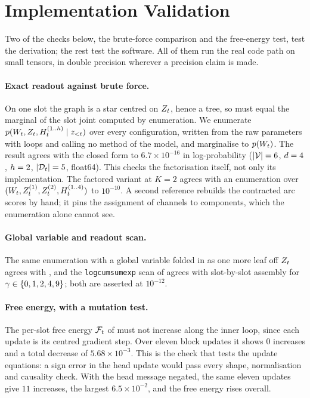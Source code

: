 \section{Implementation Validation}
\label{app:validation}

Two of the checks below, the brute-force comparison and the free-energy test, test the
derivation; the rest test the software. All of them run the
real code path on small tensors, in double precision wherever a precision claim is made.

\paragraph{Exact readout against brute force.}
On one slot the graph is a star centred on $Z_{t}$, hence a tree, so 
must equal the marginal of the slot joint computed by enumeration. We enumerate
$p(W_{t}, Z_{t}, H_{t}^{(1..h)} \mid z_{{<}t})$ over every configuration, written
from the raw parameters with loops and calling no method of the model, and marginalise to
$p(W_{t})$. The result agrees with the closed form to $6.7\times10^{-16}$ in log-probability
($|\mathcal{V}|=6$, $d=4$, $h=2$, $|\mathcal{D}_{t}|=5$, float64). This checks the factorisation
itself, not only its implementation. The factored variant at $K=2$ agrees with an enumeration
over $(W_{t}, Z_{t}^{(1)}, Z_{t}^{(2)}, H_{t}^{(1..4)})$ to $10^{-10}$. A second reference
rebuilds the contracted arc scores by hand; it pins the assignment of channels to components,
which the enumeration alone cannot see.

\paragraph{Global variable and readout scan.}
The same enumeration with a global variable folded in as one more leaf off $Z_{t}$ agrees with
, and the \texttt{logcumsumexp} scan of  agrees with
slot-by-slot assembly for $\gamma\in\{0,1,2,4,9\}$; both are asserted at $10^{-12}$.

\paragraph{Free energy, with a mutation test.}
The per-slot free energy $\mathcal{F}_t$ of  must not increase along the
inner loop, since each update is its centred gradient step. Over eleven block updates it shows
$0$ increases and a total decrease of $5.68\times10^{-3}$. This is the check that tests the
update equations: a sign error in the head update would pass every shape, normalisation and
causality check. With the head message negated, the same eleven updates give $11$ increases, the
largest $6.5\times10^{-2}$, and the free energy rises overall.

